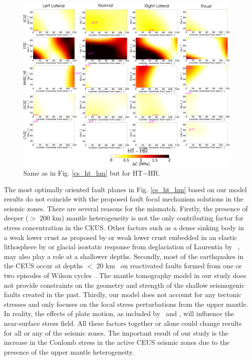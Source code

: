 \documentclass[draft,linenumbers]{agujournal2018}
\begin{document}
%
\begin{figure}[ht]
    \centering
    \includegraphics[width=\linewidth]{figures/ht_hr_summ.png}
    \caption{Same as in Fig. \ref{cs_ht_hm} but for HT$-$HR.}
    \label{cs_ht_hr}
\end{figure}

     The most optimally oriented fault planes in Fig. \ref{cs_ht_hm} based on our model results do not coincide with the proposed fault focal mechanism solutions in the seismic zones. There are several reasons for the mismatch. Firstly, the presence of deeper ($>$ 200 km) mantle heterogeneity is not the only contributing factor for stress concentration in the CEUS. Other factors such as a dense sinking body in a weak lower crust as proposed by \citet{Pollitz_2001} or weak lower crust embedded in an elastic lithosphere by \citet{Kenner_2000a} or glacial isostatic response from deglaciation of Laurentia by ~\citet{Grollimund_2001}, may also play a role at a shallower depths.  Secondly, most of the earthquakes in the CEUS occur at depths $<$ 20 km~\citep[e.g.,][]{bollinger1985seismicity, chiu1992imaging, powell2016grenville} on reactivated faults formed from one or two episodes of Wilson cycles~\citep{thomas2006tectonic, wolin2012mineral}. The mantle tomography model in our study does not provide constraints on the geometry and strength of the shallow seismogenic faults created in the past. Thirdly, our model does not account for any tectonic stresses and only focuses on the local stress perturbations from the upper mantle. In reality, the effects of plate motion, as included by~\citet{zhan2016stress} and \citet{levandowski2016dense}, will influence the near-surface stress field. All these factors together or alone could change results for all or any of the seismic zones. The important result of our study is the increase in the Coulomb stress in the active CEUS seismic zones due to the presence of the upper mantle heterogeneity.
    
\end{document}
